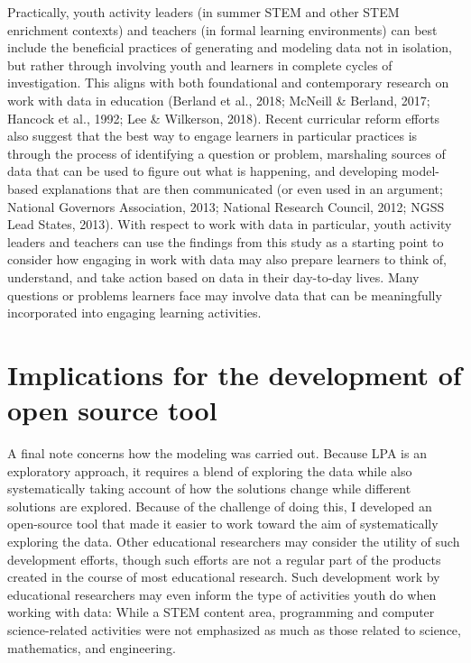 \documentclass[]{msu-thesis}
\theoremstyle{definition}
\theoremstyle{definition}
\theoremstyle{definition}
\theoremstyle{remark}
\begin{document}
Practically, youth activity leaders (in summer STEM and other STEM
enrichment contexts) and teachers (in formal learning environments) can
best include the beneficial practices of generating and modeling data
not in isolation, but rather through involving youth and learners in
complete cycles of investigation. This aligns with both foundational and
contemporary research on work with data in education (Berland et al.,
2018; McNeill \& Berland, 2017; Hancock et al., 1992; Lee \& Wilkerson,
2018). Recent curricular reform efforts also suggest that the best way
to engage learners in particular practices is through the process of
identifying a question or problem, marshaling sources of data that can
be used to figure out what is happening, and developing model-based
explanations that are then communicated (or even used in an argument;
National Governors Association, 2013; National Research Council, 2012;
NGSS Lead States, 2013). With respect to work with data in particular,
youth activity leaders and teachers can use the findings from this study
as a starting point to consider how engaging in work with data may also
prepare learners to think of, understand, and take action based on data
in their day-to-day lives. Many questions or problems learners face may
involve data that can be meaningfully incorporated into engaging
learning activities.

\section{Implications for the development of open source
tool}\label{implications-for-the-development-of-open-source-tool}

A final note concerns how the modeling was carried out. Because LPA is
an exploratory approach, it requires a blend of exploring the data while
also systematically taking account of how the solutions change while
different solutions are explored. Because of the challenge of doing
this, I developed an open-source tool that made it easier to work toward
the aim of systematically exploring the data. Other educational
researchers may consider the utility of such development efforts, though
such efforts are not a regular part of the products created in the
course of most educational research. Such development work by
educational researchers may even inform the type of activities youth do
when working with data: While a STEM content area, programming and
computer science-related activities were not emphasized as much as those
related to science, mathematics, and engineering.
\end{document}
